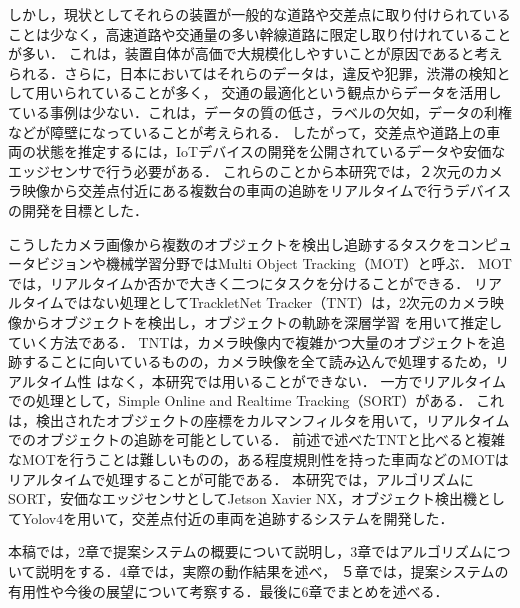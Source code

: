 \documentclass[technicalreport]{ieicej}
\begin{document}
しかし，現状としてそれらの装置が一般的な道路や交差点に取り付けられていることは少なく，高速道路や交通量の多い幹線道路に限定し取り付けれていることが多い．
これは，装置自体が高価で大規模化しやすいことが原因であると考えられる．さらに，日本においてはそれらのデータは，違反や犯罪，渋滞の検知として用いられていることが多く，
交通の最適化という観点からデータを活用している事例は少ない．これは，データの質の低さ，ラベルの欠如，データの利権などが障壁になっていることが考えられる．
したがって，交差点や道路上の車両の状態を推定するには，IoTデバイスの開発を公開されているデータや安価なエッジセンサで行う必要がある．
これらのことから本研究では，２次元のカメラ映像から交差点付近にある複数台の車両の追跡をリアルタイムで行うデバイスの開発を目標とした．

こうしたカメラ画像から複数のオブジェクトを検出し追跡するタスクをコンピュータビジョンや機械学習分野ではMulti Object Tracking（MOT）と呼ぶ．
MOTでは，リアルタイムか否かで大きく二つにタスクを分けることができる．
リアルタイムではない処理としてTrackletNet Tracker（TNT）は，2次元のカメラ映像からオブジェクトを検出し，オブジェクトの軌跡を深層学習
を用いて推定していく方法である．\cite{wang2019exploit} \cite{tang2018single} TNTは，カメラ映像内で複雑かつ大量のオブジェクトを追跡することに向いているものの，カメラ映像を全て読み込んで処理するため，リアルタイム性
はなく，本研究では用いることができない．
一方でリアルタイムでの処理として，Simple Online and Realtime Tracking（SORT）がある．\cite{bewley2016simple} \cite{wojke2017simple}
これは，検出されたオブジェクトの座標をカルマンフィルタ\cite{kalman1960new}を用いて，リアルタイムでのオブジェクトの追跡を可能としている．
前述で述べたTNTと比べると複雑なMOTを行うことは難しいものの，ある程度規則性を持った車両などのMOTはリアルタイムで処理することが可能である．
本研究では，アルゴリズムにSORT，安価なエッジセンサとしてJetson Xavier NX\cite{jetson}，オブジェクト検出機としてYolov4\cite{bochkovskiy2020yolov4}を用いて，交差点付近の車両を追跡するシステムを開発した．

本稿では，2章で提案システムの概要について説明し，3章ではアルゴリズムについて説明をする．4章では，実際の動作結果を述べ，
５章では，提案システムの有用性や今後の展望について考察する．最後に6章でまとめを述べる．
\end{document}
